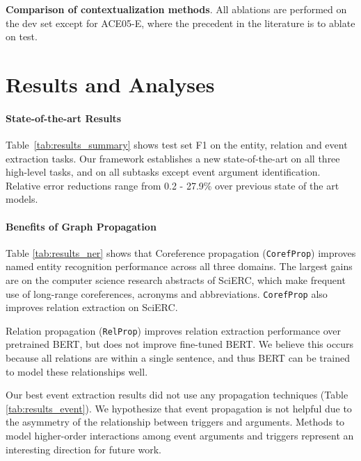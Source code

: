 \documentclass[11pt,a4paper]{article}
\begin{document}
\begin{table}[t]
    \label{tab:results_event}
  \caption{\textbf{Comparison of contextualization methods}. All ablations are performed on the dev set except for ACE05-E, where the precedent in the literature is to ablate on test.}\label{tab:ablations}


  \vspace{-1em}
\end{table} 
 \section{Results and Analyses}
\vspace{-.2cm}
\paragraph{State-of-the-art Results}
Table~\ref{tab:results_summary} shows test set F1 on the entity, relation and event extraction tasks. Our framework establishes a new state-of-the-art on all three high-level tasks, and on all subtasks except event argument identification. Relative error reductions range from 0.2 - 27.9\% over previous state of the art models.

\vspace{-.2cm}

\paragraph{Benefits of Graph Propagation}

Table \ref{tab:results_ner} shows that Coreference propagation (\texttt{CorefProp}) improves named entity recognition performance across all three domains. The largest gains are on the computer science research abstracts of SciERC, which make frequent use of long-range coreferences, acronyms and abbreviations. \texttt{CorefProp} also improves relation extraction on SciERC.

Relation propagation (\texttt{RelProp}) improves  relation extraction performance over pretrained BERT, but does not improve fine-tuned BERT.  We believe this occurs because all relations are within a single sentence, and thus BERT can be trained to model these relationships well.

Our best event extraction results did not use any propagation techniques (Table \ref{tab:results_event}). We hypothesize that event propagation is not helpful due to the asymmetry of the relationship between triggers and arguments.
Methods to model higher-order interactions among event arguments and triggers represent an interesting direction for future work.
\end{document}
